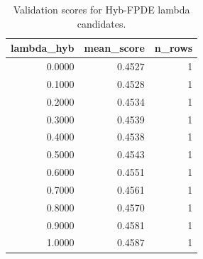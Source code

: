 \begin{table}[t]
\caption{Validation scores for Hyb-FPDE lambda candidates.}
\label{tab:lambda_distribution_computed}
\centering
\begin{tabular}{rrr}
\toprule
lambda\_hyb & mean\_score & n\_rows \\
\midrule
0.0000 & 0.4527 & 1 \\
0.1000 & 0.4528 & 1 \\
0.2000 & 0.4534 & 1 \\
0.3000 & 0.4539 & 1 \\
0.4000 & 0.4538 & 1 \\
0.5000 & 0.4543 & 1 \\
0.6000 & 0.4551 & 1 \\
0.7000 & 0.4561 & 1 \\
0.8000 & 0.4570 & 1 \\
0.9000 & 0.4581 & 1 \\
1.0000 & 0.4587 & 1 \\
\bottomrule
\end{tabular}

\end{table}
